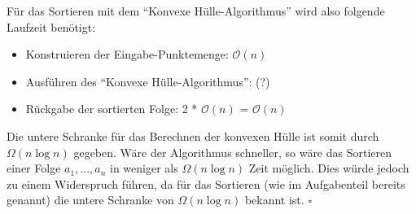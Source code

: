 \documentclass[a4paper]{article}
\begin{document}
Für das Sortieren mit dem "`Konvexe Hülle-Algorithmus"' wird also folgende Laufzeit benötigt:

\begin{itemize}
	\item Konstruieren der Eingabe-Punktemenge: $\mathcal{O}(n)$
	\item Ausführen des "`Konvexe Hülle-Algorithmus"': (?)
	\item Rückgabe der sortierten Folge: 2 * $\mathcal{O}(n)$ = $\mathcal{O}(n)$
\end{itemize}

Die untere Schranke für das Berechnen der konvexen Hülle ist somit durch $\Omega(n \log n)$
gegeben. Wäre der Algorithmus schneller, so wäre das Sortieren einer Folge $a_1, ..., a_n$
in weniger als $\Omega(n \log n)$ Zeit möglich. Dies würde jedoch zu einem Widerspruch führen, da für  das Sortieren
(wie im Aufgabenteil bereits genannt) die untere Schranke von $\Omega(n \log n)$ bekannt ist.
$\square$
\end{document}

